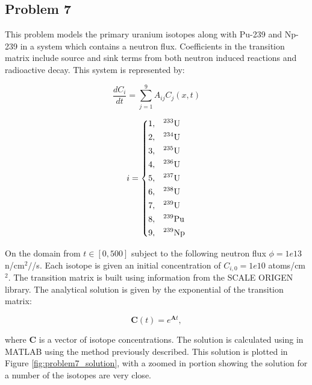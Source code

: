 \clearpage

\subsection{Problem 7}
This problem models the primary uranium isotopes along with Pu-239 and Np-239 in a system which contains a neutron flux. Coefficients in the transition matrix include source and sink terms from both neutron induced reactions and radioactive decay. This system is represented by:


\begin{equation}
\frac{d C_i}{dt} = \sum^9_{j = 1} A_{ij} C_j (x, t)
\end{equation}

\begin{equation}
i = \begin{dcases}
  1 , & \text{$^{233}$U}  \\
  2 , & \text{$^{234}$U}  \\
  3 , & \text{$^{235}$U}  \\
  4 , & \text{$^{236}$U}  \\
  5 , & \text{$^{237}$U}  \\
  6 , & \text{$^{238}$U}  \\
  7 , & \text{$^{239}$U}  \\
  8 , & \text{$^{239}$Pu} \\
  9 , & \text{$^{239}$Np} \\
\end{dcases}
\end{equation}

\noindent On the domain from $t \in [0, 500]$ subject to the following neutron flux $\phi = 1e13$ n/cm$^2/$/s. Each isotope is given an initial concentration of $C_{i, 0} = 1e10$ atoms/cm$^2$. The transition matrix is built using information from the SCALE ORIGEN library. The analytical solution is given by the exponential of the transition matrix:

\begin{equation}
   \boldsymbol{C}(t) = e^{\boldsymbol{A}t}, 
\end{equation}

\noindent where $\boldsymbol{C}$ is a vector of isotope concentrations. The solution is calculated using in MATLAB using the method previously described. This solution is plotted in Figure \ref{fig:problem7_solution}, with a zoomed in portion showing the solution for a number of the isotopes are very close. 

\clearpage

